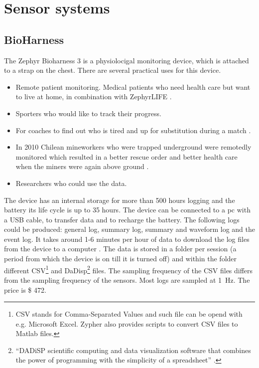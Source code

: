 \section{Sensor systems}
	\label{sec:sensorsystems}
	\subsection{BioHarness}
			The Zephyr Bioharness 3 \cite{bioharness} is a physiolocigal monitoring device, which is attached to a strap on the chest. There are several practical uses for this device.
			\begin{itemize}
				\item Remote patient monitoring. Medical patients who need health care but want to live at home, in combination with ZephyrLIFE \texttrademark \cite{bhpatients}.
				\item Sporters who would like to track their progress.
				\item For coaches to find out who is tired and up for substitution during a match \cite{bhsport}.
				\item In 2010 Chilean mineworkers who were trapped underground were remotedly monitored which resulted in a better rescue order and better health care when the miners were again above ground \cite{chile}.
				\item Researchers who could use the data.
			\end{itemize}

			The device has an internal storage for more than 500 hours logging and the battery its life cycle is up to 35 hours. The device can be connected to a pc with a USB cable, to transfer data and to recharge the battery. The following logs could be produced: general log, summary log, summary and waveform log and the event log. 
			It takes around 1-6 minutes per hour of data to download the log files from the device to a computer \cite{bhdatasheet}. The data is stored in a folder per session (a period from which the device is on till it is turned off) and within the folder different CSV\footnote{CSV stands for Comma-Separated Values and such file can be opend with e.g. Microsoft Excel. Zypher also provides scripts to convert CSV files to Matlab files.} and DaDisp\footnote{``DADiSP scientific computing and data visualization software that combines the power of programming with the simplicity of a spreadsheet'' \cite{dadisp}.} files. The sampling frequency of the CSV files differs from the sampling frequency of the sensors. Most logs are sampled at \SI{1}{\hertz}.
			The price is \$ 472.
		
